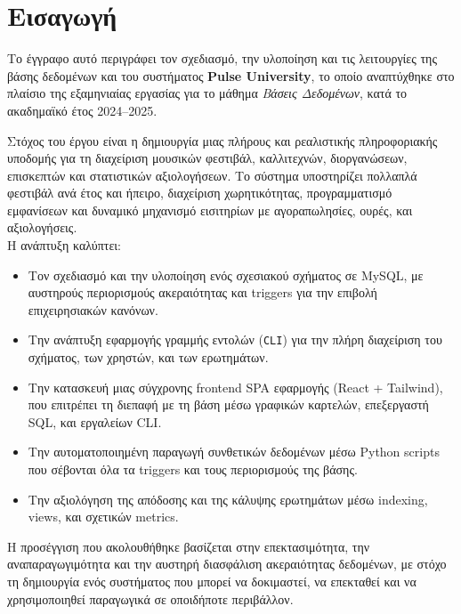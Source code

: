 \documentclass[13pt]{extarticle}
\begin{document}
\clearpage
\tableofcontents
\clearpage
\setcounter{page}{2}

\clearpage
\section{Εισαγωγή}

Το έγγραφο αυτό περιγράφει τον σχεδιασμό, την υλοποίηση και τις λειτουργίες της βάσης δεδομένων και του συστήματος \textbf{Pulse University}, το οποίο αναπτύχθηκε στο πλαίσιο της εξαμηνιαίας εργασίας για το μάθημα \textit{Βάσεις Δεδομένων}, κατά το ακαδημαϊκό έτος 2024–2025.

Στόχος του έργου είναι η δημιουργία μιας πλήρους και ρεαλιστικής πληροφοριακής υποδομής για τη διαχείριση μουσικών φεστιβάλ, καλλιτεχνών, διοργανώσεων, επισκεπτών και στατιστικών αξιολογήσεων. Το σύστημα υποστηρίζει πολλαπλά φεστιβάλ ανά έτος και ήπειρο, διαχείριση χωρητικότητας, προγραμματισμό εμφανίσεων και δυναμικό μηχανισμό εισιτηρίων με αγοραπωλησίες, ουρές, και αξιολογήσεις.\\

Η ανάπτυξη καλύπτει:
\begin{itemize}
  \item Τον σχεδιασμό και την υλοποίηση ενός σχεσιακού σχήματος σε MySQL, με αυστηρούς περιορισμούς ακεραιότητας και triggers για την επιβολή επιχειρησιακών κανόνων.
  \item Την ανάπτυξη εφαρμογής γραμμής εντολών (\texttt{CLI}) για την πλήρη διαχείριση του σχήματος, των χρηστών, και των ερωτημάτων.
  \item Την κατασκευή μιας σύγχρονης frontend SPA εφαρμογής (React + Tailwind), που επιτρέπει τη διεπαφή με τη βάση μέσω γραφικών καρτελών, επεξεργαστή SQL, και εργαλείων CLI.
  \item Την αυτοματοποιημένη παραγωγή συνθετικών δεδομένων μέσω Python scripts που σέβονται όλα τα triggers και τους περιορισμούς της βάσης.
  \item Την αξιολόγηση της απόδοσης και της κάλυψης ερωτημάτων μέσω indexing, views, και σχετικών metrics.
\end{itemize}

Η προσέγγιση που ακολουθήθηκε βασίζεται στην επεκτασιμότητα, την αναπαραγωγιμότητα και την αυστηρή διασφάλιση ακεραιότητας δεδομένων, με στόχο τη δημιουργία ενός συστήματος που μπορεί να δοκιμαστεί, να επεκταθεί και να χρησιμοποιηθεί παραγωγικά σε οποιδήποτε περιβάλλον.
\end{document}

